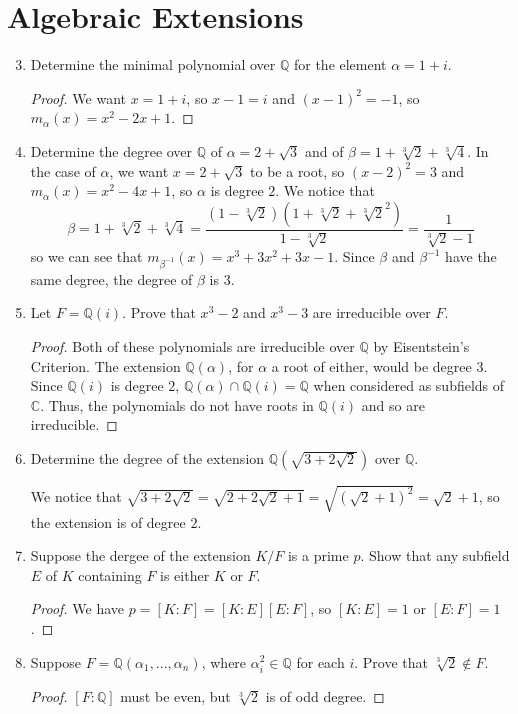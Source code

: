 \documentclass{report}
\newcommand{\Q}{\mathbb{Q}}
\newcommand{\C}{\mathbb{C}}
\begin{document}
\section{Algebraic Extensions}
\begin{enumerate} 
	\setcounter{enumi}{2}
	\item Determine the minimal polynomial over $\Q$ for the element $\alpha=1+i$.
		\begin{proof}
			We want $x=1+i$, so $x-1=i$ and $(x-1)^2=-1$, so $m_\alpha(x)=x^2-2x+1$. 
		\end{proof}
	\item Determine the degree over $\Q$ of $\alpha=2+\sqrt{3}$ and of $\beta=1+\sqrt[3]{2}+\sqrt[3]{4}$.
		In the case of $\alpha$, we want $x=2+\sqrt{3}$ to be a root, so $(x-2)^2=3$ and $m_\alpha(x)=x^2-4x+1$, so $\alpha$ is degree $2$.
		We notice that
		$$\beta=1+\sqrt[3]{2}+\sqrt[3]{4}=\frac{(1-\sqrt[3]{2})(1+\sqrt[3]{2}+\sqrt[3]{2}^2)}{1-\sqrt[3]{2}}=\frac{1}{\sqrt[3]{2}-1}$$
		so we can see that $m_{\beta^{-1}}(x)=x^3+3x^2+3x-1$. Since $\beta$ and $\beta^{-1}$ have the same degree, the degree of $\beta$ is $3$.
	\item Let $F=\Q(i)$. Prove that $x^3-2$ and $x^3-3$ are irreducible over $F$.
		\begin{proof}
			Both of these polynomials are irreducible over $\Q$ by Eisentstein's Criterion. The extension $\Q(\alpha)$, for $\alpha$ a root of either, would be degree $3$.
			Since $\Q(i)$ is degree $2$, $\Q(\alpha)\cap\Q(i)=\Q$ when considered as subfields of $\C$. Thus, the polynomials do not have roots in $\Q(i)$ and so are irreducible.
		\end{proof}
		\setcounter{enumi}{9}
	\item Determine the degree of the extension $\Q(\sqrt{3+2\sqrt{2}})$ over $\Q$.
		\newline

		We notice that $\sqrt{3+2\sqrt{2}}=\sqrt{2+2\sqrt{2}+1}=\sqrt{(\sqrt{2}+1)^2}=\sqrt{2}+1$, so the extension is of degree $2$.
		\setcounter{enumi}{11}
	\item Suppose the dergee of the extension $K / F$ is a prime $p$. Show that any subfield $E$ of $K$ containing $F$ is either $K$ or $F$.
		\begin{proof}
			We have $p=[K:F]=[K:E][E:F]$, so $[K:E]=1$ or $[E:F]=1$.
		\end{proof}
	\item Suppose $F=\Q(\alpha_1,...,\alpha_n)$, where $\alpha_i^2\in\Q$ for each $i$. Prove that $\sqrt[3]{2}\notin F$.
		\begin{proof}
			$[F:\Q]$ must be even, but $\sqrt[3]{2}$ is of odd degree.
		\end{proof}
		

\end{enumerate}
\end{document}
